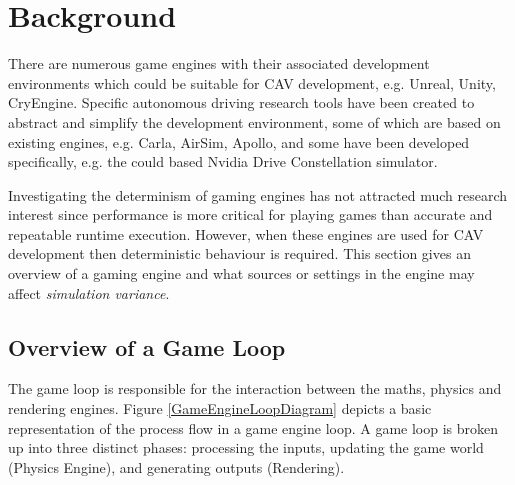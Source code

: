 






\section{Background} \label{s:background}

There are numerous game engines with their associated development environments which could be suitable for CAV development, e.g. Unreal, Unity, CryEngine. Specific autonomous driving research tools have been created to abstract and simplify the development environment, some of which are based on existing engines, e.g. Carla, AirSim, Apollo, and some have been developed specifically, e.g. the could based Nvidia Drive Constellation simulator. 

Investigating the determinism of gaming engines has not attracted much research interest since performance is more critical for playing games than accurate and repeatable runtime execution. However, when these engines are used for CAV development then deterministic behaviour is required. This section gives an overview of a gaming engine and what sources or settings in the engine may affect \textit{simulation variance}.
%

\subsection{Overview of a Game Loop} \label{GameLoopSection}
The game loop is responsible for the interaction between the maths, physics and rendering engines. Figure \ref{GameEngineLoopDiagram} depicts a basic representation of the process flow in a game engine loop. A game loop is broken up into three distinct phases: processing the inputs, updating the game world (Physics Engine), and generating outputs (Rendering).~\cite{GameEngineArchBook}

